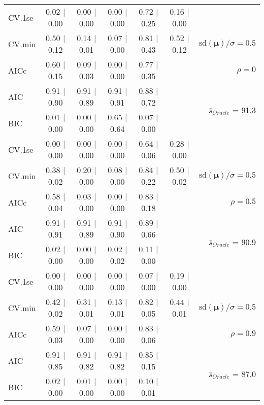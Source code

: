 \begin{table}
\begin{center}
\begin{tabular}{l*{5}{c}|r}
 \hline 
CV.1se & 0.02 $\mid$ 0.00 & 0.00 $\mid$ 0.00 & 0.00 $\mid$ 0.00 & 0.72 $\mid$ 0.25 & 0.16 $\mid$ 0.00 & \\
CV.min & 0.50 $\mid$ 0.12 & 0.14 $\mid$ 0.01 & 0.07 $\mid$ 0.00 & 0.81 $\mid$ 0.43 & 0.52 $\mid$ 0.12 &  $\mathrm{sd}(\mathbf{\mu})/\sigma=0.5$ \\
AICc & 0.60 $\mid$ 0.15 & 0.09 $\mid$ 0.03 & 0.00 $\mid$ 0.00 & 0.77 $\mid$ 0.35 & & $\rho=0$ \\
AIC & 0.91 $\mid$ 0.90 & 0.91 $\mid$ 0.89 & 0.91 $\mid$ 0.91 & 0.88 $\mid$ 0.72 & &  \multirow{2}{*}{$\bar{s}_{Oracle}$ = 91.3} \\
BIC & 0.01 $\mid$ 0.00 & 0.00 $\mid$ 0.00 & 0.65 $\mid$ 0.64 & 0.07 $\mid$ 0.00 & &  \\
 \hline 
CV.1se & 0.00 $\mid$ 0.00 & 0.00 $\mid$ 0.00 & 0.00 $\mid$ 0.00 & 0.64 $\mid$ 0.06 & 0.28 $\mid$ 0.00 & \\
CV.min & 0.38 $\mid$ 0.02 & 0.20 $\mid$ 0.00 & 0.08 $\mid$ 0.00 & 0.84 $\mid$ 0.22 & 0.50 $\mid$ 0.02 &  $\mathrm{sd}(\mathbf{\mu})/\sigma=0.5$ \\
AICc & 0.58 $\mid$ 0.04 & 0.03 $\mid$ 0.00 & 0.00 $\mid$ 0.00 & 0.83 $\mid$ 0.18 & & $\rho=0.5$ \\
AIC & 0.91 $\mid$ 0.91 & 0.91 $\mid$ 0.89 & 0.91 $\mid$ 0.90 & 0.89 $\mid$ 0.66 & &  \multirow{2}{*}{$\bar{s}_{Oracle}$ = 90.9} \\
BIC & 0.02 $\mid$ 0.00 & 0.00 $\mid$ 0.00 & 0.02 $\mid$ 0.02 & 0.11 $\mid$ 0.00 & &  \\
 \hline 
CV.1se & 0.00 $\mid$ 0.00 & 0.00 $\mid$ 0.00 & 0.00 $\mid$ 0.00 & 0.07 $\mid$ 0.00 & 0.19 $\mid$ 0.00 & \\
CV.min & 0.42 $\mid$ 0.02 & 0.31 $\mid$ 0.01 & 0.13 $\mid$ 0.01 & 0.82 $\mid$ 0.05 & 0.44 $\mid$ 0.01 &  $\mathrm{sd}(\mathbf{\mu})/\sigma=0.5$ \\
AICc & 0.59 $\mid$ 0.03 & 0.07 $\mid$ 0.00 & 0.00 $\mid$ 0.00 & 0.83 $\mid$ 0.06 & & $\rho=0.9$ \\
AIC & 0.91 $\mid$ 0.85 & 0.91 $\mid$ 0.82 & 0.91 $\mid$ 0.82 & 0.85 $\mid$ 0.15 & &  \multirow{2}{*}{$\bar{s}_{Oracle}$ = 87.0} \\
BIC & 0.02 $\mid$ 0.00 & 0.01 $\mid$ 0.00 & 0.00 $\mid$ 0.00 & 0.10 $\mid$ 0.01 & &  \\
 \hline 
\end{tabular}
\end{center}
\vspace{-1cm}
\end{table}




